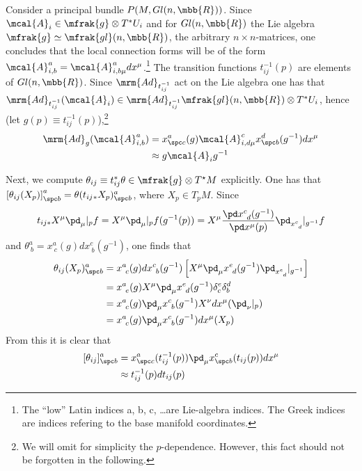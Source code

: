 \documentclass[10pt,reqno]{amsart}
\numberwithin{equation}{section}
\begin{document}
\begin{example}
	Consider a principal bundle $P(M,Gl(n,\mbb{R}))$. Since 
	$\mcal{A}_i \in \mfrak{g} \otimes T^\ast U_i$ and for 
	$Gl(n,\mbb{R})$ the Lie algebra $\mfrak{g} \simeq 
	\mfrak{gl}(n,\mbb{R})$, the arbitrary $n\times n$-matrices, one 
	concludes that the local connection forms will be of the form 
	$\mcal{A}^a_{i,b} = \mcal{A}^a_{i,b\mu} dx^\mu$.\footnote{The 
		``low'' Latin indices a, b, c, \dots are Lie-algebra indices.  
		The Greek indices are indices refering to the base manifold 
		coordinates.} The transition functions $t_{ij}^{-1}(p)$ are 
	elements of $Gl(n,\mbb{R})$. Since $\mrm{Ad}_{t_{ij}^{-1}}$ act 
	on the Lie algebra one has that $\mrm{Ad}_{t_{ij}^{-1}} 
	(\mcal{A}_i) \in \mrm{Ad}_{t_{ij}^{-1}} \mfrak{gl}(n,\mbb{R}) 
	\otimes T^\ast U_i$, hence (let $g(p) \equiv 
	t_{ij}^{-1}(p)$),\footnote{We will omit for simplicity the 
		$p$-dependence. However, this fact should
	not be forgotten in the following.}
	\begin{equation}
		\begin{split}
			\mrm{Ad}_{g}(\mcal{A}^a_{i,b})
			&= x^a_{\spc c}(g) \mcal{A}^c_{i,d\mu} x^d_{\spc b}(g^{-1}) 
			dx^\mu \\
			&\approx g \mcal{A}_i g^{-1}
		\end{split}
	\end{equation}

	Next, we compute $\theta_{ij} \equiv t_{ij}^\ast \theta \in 
	\mfrak{g} \otimes T^\star M$ explicitly. One has that $\left[
	\theta_{ij}(X_p) \right]^a_{\spc b} = \theta(t_{ij}{}_\ast 
X_p)^a_{\spc b}$, where $X_p \in T_pM$. Since
	\begin{displaymath}
		t_{ij\ast} X^\mu \pd_\mu|_p f = X^\mu \pd_\mu|_p 
		f(g^{-1}(p)) = X^\mu \frac{\pd x^c_{~d}(g^{-1})}{\pd 
			x^\mu(p)} \pd_{x^c_{~d}}|_{g^{-1}} f
	\end{displaymath}
  and $\theta^a_{~b} = x^a_{~c}(g) dx^c_{~b}(g^{-1})$, one finds 
  that
	\begin{displaymath}
		\begin{split}
			\theta_{ij}(X_p)^a_{\spc b}
			&= x^a_{~c}(g) dx^c_{~b}(g^{-1}) \left[ X^\mu \pd_\mu 
				x^e_{~d}(g^{-1}) \pd_{x^e_{~d}}|_{g^{-1}}\right] \\
			&= x^a_{~e}(g) X^\mu \pd_\mu x^e_{~d}(g^{-1})
	\delta^e_c \delta^d_b \\
			&= x^a_{~c}(g) \pd_\mu x^c_{~b}(g^{-1})
	X^\nu dx^\mu(\pd_\nu|_p) \\
			&= x^a_{~c}(g) \pd_\mu x^c_{~b}(g^{-1})
	dx^\mu(X_p)
		\end{split}
	\end{displaymath}
	From this it is clear that
	\begin{equation}
		\begin{split}
			[\theta_{ij}]^a_{\spc b} &= x^a_{\spc c}(t_{ij}^{-1}(p)) 
			\pd_\mu x^c_{\spc b}(t_{ij}(p)) dx^\mu \\
			&\approx t_{ij}^{-1}(p) dt_{ij}(p)
		\end{split}
	\end{equation}


\end{example}
\end{document}
